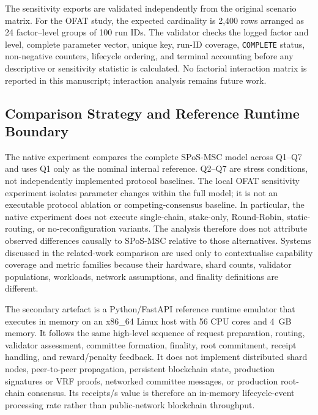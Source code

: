\documentclass[a4paper,fleqn]{cas-sc}
\begin{document}
The sensitivity exports are validated independently from the original scenario
matrix. For the OFAT study, the expected cardinality is 2,400 rows arranged as
24 factor--level groups of 100 run IDs. The validator checks the logged
factor and level, complete parameter vector, unique key, run-ID coverage,
\texttt{COMPLETE} status, non-negative counters, lifecycle ordering, and terminal
accounting before any descriptive or sensitivity statistic is calculated. No
factorial interaction matrix is reported in this manuscript; interaction
analysis remains future work.

\subsection{Comparison Strategy and Reference Runtime Boundary}
\label{subsec:baselines}
\label{subsec:experimental_environment}

The native experiment compares the complete SPoS-MSC model across Q1--Q7 and
uses Q1 only as the nominal internal reference. Q2--Q7 are stress conditions,
not independently implemented protocol baselines. The local OFAT sensitivity
experiment isolates parameter changes within the full model; it is not an
executable protocol ablation or competing-consensus baseline. In particular, the native
experiment does not execute single-chain, stake-only, Round-Robin,
static-routing, or no-reconfiguration variants. The analysis therefore does not
attribute observed differences causally to SPoS-MSC relative to those
alternatives. Systems discussed in the related-work comparison are used only to
contextualise capability coverage and metric families because their hardware,
shard counts, validator populations, workloads, network assumptions, and
finality definitions are different.

The secondary artefact is a Python/FastAPI reference runtime emulator that executes
in memory on an x86\_64 Linux host with 56 CPU cores and 4~GB memory. It follows
the same high-level sequence of request preparation, routing, validator
assessment, committee formation, finality, root commitment, receipt handling,
and reward/penalty feedback. It does not implement distributed shard nodes,
peer-to-peer propagation, persistent blockchain state, production signatures
or VRF proofs, networked committee messages, or production root-chain
consensus. Its receipts/s value is therefore an in-memory lifecycle-event
processing rate rather than public-network blockchain throughput.
\end{document}
